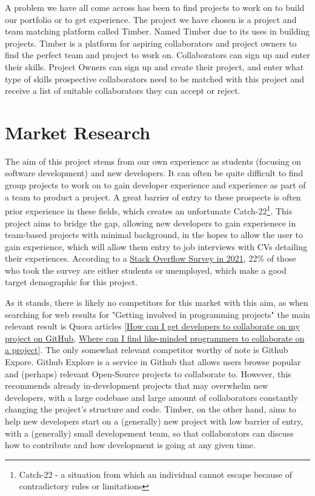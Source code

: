 \documentclass[a4paper,11pt]{report}
\begin{document}
A problem we have all come across has been to find projects to work on to build
our portfolio or to get experience. The project we have chosen is a project and
team matching platform called Timber. Named Timber due to its uses in building
projects. Timber is a platform for aspiring collaborators and project owners to
find the perfect team and project to work on. Collaborators can sign up and
enter their skills. Project Owners can sign up and create their project, and
enter what type of skills prospective collaborators need to be matched with this
project and receive a list of suitable collaborators they can accept or reject.

\chapter{Market Research}
The aim of this project stems from our own experience as students (focusing on
software development) and new developers. It can often be quite difficult to
find group projects to work on to gain developer experience and experience as
part of a team to product a project. A great barrier of entry to these prospects
is often prior experience in these fields, which creates an unfortunate
Catch-22\footnote{Catch-22 - a  situation from which an individual cannot escape
because of contradictory rules or limitations}. This project aims to bridge the
gap, allowing new developers to gain experienece in team-based projects with
minimal background, in the hopes to allow the user to gain experience, which
will allow them entry to job interviews with CVs detailing their experiences.
According to a \href{https://insights.stackoverflow.com/survey/2021#work}{Stack
Overflow Survey in 2021}, 22\% of those who took the survey are either students or
unemployed, which make a good target demographic for this project.

As it stands, there is likely no competitors for this market with this aim, as
when searching for web results for "Getting involved in programming projects"
the main relevant result is Quora articles
[\href{https://www.quora.com/How-can-I-get-developers-to-collaborate-on-my-project-on-GitHub}{How
can I get developers to collaborate on my project on GitHub},
\href{https://www.quora.com/Where-can-I-find-like-minded-programmers-to-collaborate-on-a-project}{Where
can I find like-minded programmers to collaborate on a project}]. The only
somewhat relevant competitor worthy of note is Github Expore. Github Explore is
a service in Github that allows users browse popular and (perhaps) relevant
Open-Source projects to collaborate to. However, this recommends already
in-development projects that may overwhelm new developers, with a large codebase
and large amount of collaborators constantly changing the project's structure
and code. Timber, on the other hand, aims to help new developers start on a
(generally) new project with low barrier of entry, with a (generally) small
developement team, so that collaborators can discuss how to contribute and how
development is going at any given time.
\end{document}
